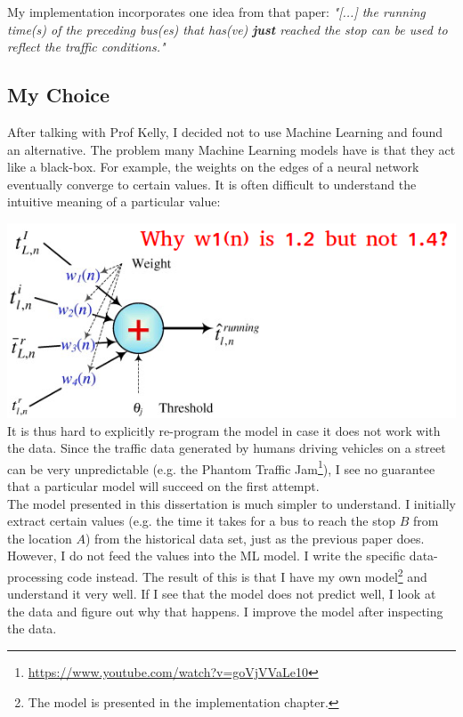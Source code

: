 \documentclass[12pt,a4paper,oneside,openright]{report}
\begin{document}
My implementation incorporates one idea from that paper:
\textit{"[...] the running time(s) of the preceding bus(es) that has(ve) \textbf{just}
reached the stop can be used to reflect the traffic conditions."} \\


\subsection{My Choice}

After talking with Prof Kelly, I decided not to use Machine Learning and found an alternative.
The problem many Machine Learning models have is that they act like a black-box. For example,
the weights on the edges of a neural network eventually converge to certain values. It is often
difficult to understand the intuitive meaning of a particular value:

\includegraphics[width=\textwidth]{figs/ann.png} \\

It is thus hard to explicitly re-program the model in case it does not work with the data.
Since the traffic data generated by humans driving vehicles on a street can be very
unpredictable (e.g. the Phantom Traffic
Jam\footnote{\textcolor{blue}{\url{https://www.youtube.com/watch?v=goVjVVaLe10}}}),
I see no guarantee that a particular model will succeed on the first attempt. \\

The model presented in this dissertation is much simpler to understand. I initially extract
certain values (e.g. the time it takes for a bus to reach the stop $B$ from the location $A$)
from the historical data set, just as the previous paper does. However, I do not feed the values
into the ML model. I write the specific data-processing code instead. The result of this is that
I have my own model\footnote{The model is presented in the
implementation chapter.} and understand it very well. If I see that the model does not predict
well, I look at the data and figure out why that happens. I improve the model after inspecting
the data. \\
\end{document}
